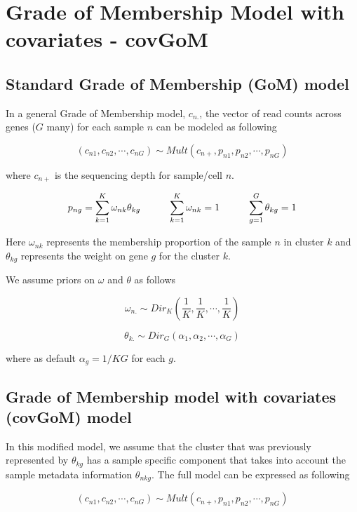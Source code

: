 \documentclass[a4paper, 12pt]{article}
\begin{document}
\section{Grade of Membership Model with covariates - covGoM}


\subsection{Standard Grade of Membership (GoM) model}

In a general Grade of Membership  model, $c_{n.}$, the vector of read counts across genes ($G$ many) for each sample $n$  can be modeled as following 

$$ \left ( c_{n1}, c_{n2},  \cdots, c_{nG} \right )  \sim Mult \left ( c_{n+}, p_{n1}, p_{n2}, \cdots, p_{nG} \right ) $$

where $c_{n+}$ is the sequencing depth for sample/cell $n$. 

$$ p_{ng} = \sum_{k=1}^{K} \omega_{nk} \theta_{kg} \hspace{1 cm} \sum_{k=1}^{K} \omega_{nk} = 1 \hspace{1 cm} \sum_{g=1}^{G} \theta_{kg} = 1 $$

Here $\omega_{nk}$ represents the membership proportion of the sample $n$ in cluster $k$ and $\theta_{kg}$ represents the weight on gene $g$ for the cluster $k$. 

We assume priors on $\omega$ and $\theta$ as follows 

$$ \omega_{n.} \sim Dir_{K} \left ( \frac{1}{K}, \frac{1}{K}, \cdots, \frac{1}{K} \right ) $$

$$ \theta_{k.} \sim Dir_{G} \left ( \alpha_1, \alpha_2, \cdots, \alpha_G \right ) $$

where as default $\alpha_{g} = 1/KG$ for each $g$.

\subsection{Grade of Membership model with covariates (covGoM) model}

In this modified model, we assume that the cluster that was previously represented by $\theta_{kg}$ has a sample specific component that takes into account the sample metadata information $\theta_{nkg}$. The full model can be expressed as following 

$$ \left ( c_{n1}, c_{n2},  \cdots, c_{nG} \right )  \sim Mult \left ( c_{n+}, p_{n1}, p_{n2}, \cdots, p_{nG} \right ) $$
\end{document}
